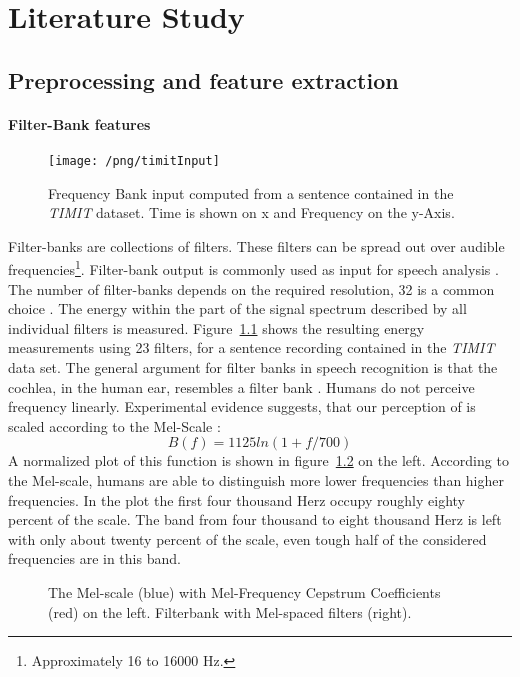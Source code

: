 \chapter{Literature Study}
\label{cha:intro}

\section{Preprocessing and feature extraction}
\subsubsection{Filter-Bank features}
\begin{figure}
\centering
\texttt{[image: /png/timitInput]}
\caption{Frequency Bank input computed from a sentence contained in the \textit{TIMIT} dataset. Time is shown on x and Frequency on the y-Axis.}
\label{fig:timitInput}
\end{figure}
Filter-banks are collections of filters. These filters can be spread out over audible frequencies\footnote{Approximately 16 to 16000 Hz.}. Filter-bank output is commonly used as input for speech analysis \cite{Huang2001}\cite{Chan2015}. The number of filter-banks depends on the required resolution, 32 is a common choice \cite{Juang1987}. The energy within the part of the signal spectrum described by all individual filters is measured. Figure~\ref{fig:timitInput} shows the resulting energy measurements using 23 filters, for a sentence recording contained in the \textit{TIMIT} data set.
The general argument for filter banks in speech recognition is that the cochlea, in the human ear, resembles a filter bank \cite[page 30]{Huang2001}. Humans do not perceive frequency linearly. Experimental evidence suggests, that our perception of is scaled according to the Mel-Scale \cite[page 34]{Huang2001}:
\begin{equation}
B(f) = 1125 ln(1 + f / 700)
\end{equation}
A normalized plot of this function is shown in figure~\ref{fig:mel} on the left.
According to the Mel-scale, humans are able to distinguish more lower frequencies than higher frequencies. In the plot the first four thousand Herz occupy roughly eighty percent of the scale. The band from four thousand to eight thousand Herz is left with only about twenty percent of the scale, even tough half of the considered frequencies are in this band.
\begin{figure}
\centering


\caption{The Mel-scale (blue) with Mel-Frequency Cepstrum Coefficients (red)  on the left. Filterbank with Mel-spaced filters (right).}
\label{fig:mel}
\end{figure}
